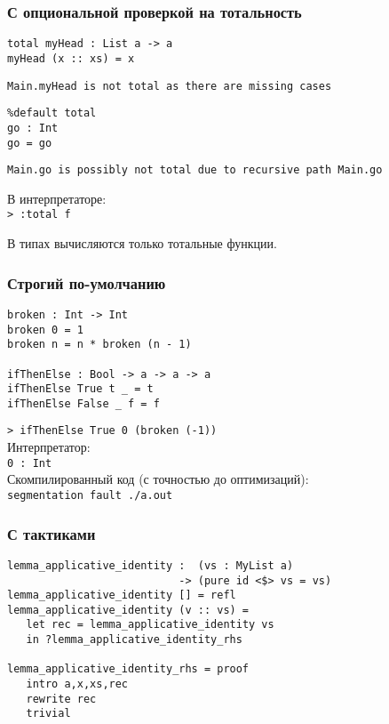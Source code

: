 \begin{frame}[fragile]
   \frametitle{С опциональной проверкой на тотальность}
   \begin{lstlisting}
total myHead : List a -> a
myHead (x :: xs) = x
   \end{lstlisting}
   \texttt{Main.myHead is not total as there are missing cases}
   \vspace{\baselineskip}

   \begin{lstlisting}
%default total
go : Int
go = go
   \end{lstlisting}
   \texttt{Main.go is possibly not total due to recursive path Main.go}
   \vspace{\baselineskip}

   В интерпретаторе:\\
   \texttt{> :total f}
   \vspace{\baselineskip}

   В типах вычисляются только тотальные функции.
\end{frame}

\begin{frame}[fragile]
   \frametitle{Строгий по-умолчанию}
   \begin{lstlisting}
broken : Int -> Int
broken 0 = 1
broken n = n * broken (n - 1)

ifThenElse : Bool -> a -> a -> a
ifThenElse True t _ = t
ifThenElse False _ f = f
   \end{lstlisting}
   \texttt{> ifThenElse True 0 (broken (-1))}\\\vspace{0.5em}
   Интерпретатор:\\
   \texttt{0 : Int}\\\vspace{0.5em}
   Скомпилированный код (с точностью до оптимизаций):\\
   \texttt{segmentation fault ./a.out}
\end{frame}

\begin{frame}[fragile]
   \frametitle{С тактиками}
   \begin{lstlisting}
lemma_applicative_identity :  (vs : MyList a)
                           -> (pure id <$> vs = vs)
lemma_applicative_identity [] = refl
lemma_applicative_identity (v :: vs) =
   let rec = lemma_applicative_identity vs
   in ?lemma_applicative_identity_rhs

lemma_applicative_identity_rhs = proof
   intro a,x,xs,rec
   rewrite rec
   trivial
   \end{lstlisting}
\end{frame}

